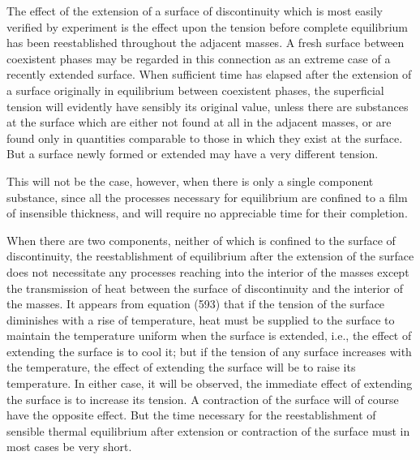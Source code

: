 \documentclass[12pt]{article}
\begin{document}
{The effect of the extension of a surface of discontinuity which is most easily verified by experiment is the effect upon the tension before complete equilibrium has been reestablished throughout the adjacent masses. A fresh surface between coexistent phases may be regarded in this connection as an extreme case of a recently extended surface. When sufficient time has elapsed after the extension of a surface originally in equilibrium between coexistent phases, the superficial tension will evidently have sensibly its original value, unless there are substances at the surface which are either not found at all in the adjacent masses, or are found only in quantities comparable to those in which they exist at the surface. But a surface newly formed or extended may have a very different tension.

This will not be the case, however, when there is only a single component substance, since all the processes necessary for equilibrium are confined to a film of insensible thickness, and will require no appreciable time for their completion.

When there are two components, neither of which is confined to the surface of discontinuity, the reestablishment of equilibrium after the extension of the surface does not necessitate any processes reaching into the interior of the masses except the transmission of heat between the surface of discontinuity and the interior of the masses. It appears from equation (593) that if the tension of the surface diminishes with a rise of temperature, heat must be supplied to the surface to maintain the temperature uniform when the surface is extended, i.e., the effect of extending the surface is to cool it; but if the tension of any surface increases with the temperature, the effect of extending the surface will be to raise its temperature. In either case, it will be observed, the immediate effect of extending the surface is to increase its tension. A contraction of the surface will of course have the opposite effect.  But the time necessary for the reestablishment of sensible thermal equilibrium after extension or contraction of the surface must in most cases be very short.

}
\end{document}
